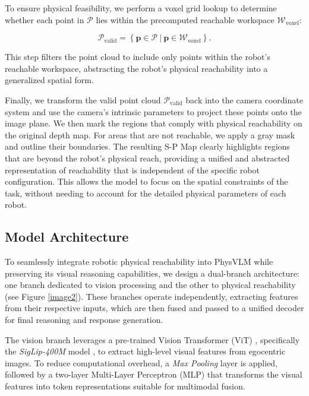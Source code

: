 \documentclass[10pt,twocolumn,letterpaper]{article}
\begin{document}
To ensure physical feasibility, we perform a voxel grid lookup to determine whether each point in \(\mathcal{P}\) lies within the precomputed reachable workspace \(\mathcal{W}_{\text{voxel}}\):

\begin{equation}
\mathcal{P}_{\text{valid}} = \left\{ \mathbf{p} \in \mathcal{P} \ \bigg| \ \mathbf{p} \in \mathcal{W}_{\text{voxel}} \right\}.
\end{equation}

This step filters the point cloud to include only points within the robot's reachable workspace, abstracting the robot's physical reachability into a generalized spatial form.

Finally, we transform the valid point cloud \(\mathcal{P}_{\text{valid}}\) back into the camera coordinate system and use the camera's intrinsic parameters to project these points onto the image plane. We then mark the regions that comply with physical reachability on the original depth map. For areas that are not reachable, we apply a gray mask and outline their boundaries. The resulting S-P Map clearly highlights regions that are beyond the robot's physical reach, providing a unified and abstracted representation of reachability that is independent of the specific robot configuration. This allows the model to focus on the spatial constraints of the task, without needing to account for the detailed physical parameters of each robot.


\subsection{Model Architecture}
\label{3.2}

To seamlessly integrate robotic physical reachability into PhysVLM while preserving its visual reasoning capabilities, we design a dual-branch architecture: one branch dedicated to vision processing and the other to physical reachability (see Figure \ref{image2}). These branches operate independently, extracting features from their respective inputs, which are then fused and passed to a unified decoder for final reasoning and response generation.

The vision branch leverages a pre-trained Vision Transformer (ViT) \cite{vit}, specifically the \textit{SigLip-400M} model \cite{siglip}, to extract high-level visual features from egocentric images. To reduce computational overhead, a \textit{Max Pooling} layer is applied, followed by a two-layer Multi-Layer Perceptron (MLP) that transforms the visual features into token representations suitable for multimodal fusion.
\end{document}
